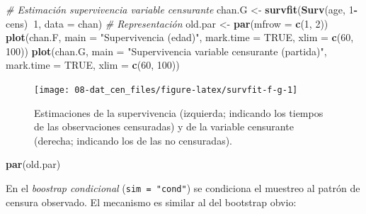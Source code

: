 \documentclass[]{book}
\newenvironment{Shaded}{\begin{snugshade}}{\end{snugshade}}
\newcommand{\KeywordTok}[1]{\textcolor[rgb]{0.13,0.29,0.53}{\textbf{#1}}}
\newcommand{\DataTypeTok}[1]{\textcolor[rgb]{0.13,0.29,0.53}{#1}}
\newcommand{\DecValTok}[1]{\textcolor[rgb]{0.00,0.00,0.81}{#1}}
\newcommand{\StringTok}[1]{\textcolor[rgb]{0.31,0.60,0.02}{#1}}
\newcommand{\CommentTok}[1]{\textcolor[rgb]{0.56,0.35,0.01}{\textit{#1}}}
\newcommand{\OtherTok}[1]{\textcolor[rgb]{0.56,0.35,0.01}{#1}}
\newcommand{\OperatorTok}[1]{\textcolor[rgb]{0.81,0.36,0.00}{\textbf{#1}}}
\newcommand{\NormalTok}[1]{#1}
\theoremstyle{definition}
\theoremstyle{definition}
\theoremstyle{definition}
\theoremstyle{remark}
\begin{document}
\begin{Shaded}
\begin{Highlighting}[]
\CommentTok{# Estimación supervivencia variable censurante}
\NormalTok{chan.G <-}\StringTok{ }\KeywordTok{survfit}\NormalTok{(}\KeywordTok{Surv}\NormalTok{(age, }\DecValTok{1}\OperatorTok{-}\NormalTok{cens)}\OperatorTok{~}\DecValTok{1}\NormalTok{, }\DataTypeTok{data =}\NormalTok{ chan)}
\CommentTok{# Representación}
\NormalTok{old.par <-}\StringTok{ }\KeywordTok{par}\NormalTok{(}\DataTypeTok{mfrow =} \KeywordTok{c}\NormalTok{(}\DecValTok{1}\NormalTok{, }\DecValTok{2}\NormalTok{))}
\KeywordTok{plot}\NormalTok{(chan.F, }\DataTypeTok{main =} \StringTok{"Supervivencia (edad)"}\NormalTok{, }\DataTypeTok{mark.time =} \OtherTok{TRUE}\NormalTok{, }
    \DataTypeTok{xlim =} \KeywordTok{c}\NormalTok{(}\DecValTok{60}\NormalTok{, }\DecValTok{100}\NormalTok{))}
\KeywordTok{plot}\NormalTok{(chan.G, }\DataTypeTok{main =} \StringTok{"Supervivencia variable censurante (partida)"}\NormalTok{, }
     \DataTypeTok{mark.time =} \OtherTok{TRUE}\NormalTok{, }\DataTypeTok{xlim =} \KeywordTok{c}\NormalTok{(}\DecValTok{60}\NormalTok{, }\DecValTok{100}\NormalTok{))}
\end{Highlighting}
\end{Shaded}

\begin{figure}[!htb]

{\centering \texttt{[image: 08-dat\_cen\_files/figure-latex/survfit-f-g-1]} 

}

\caption{Estimaciones de la supervivencia (izquierda; indicando los tiempos de las observaciones censuradas) y de la variable censurante (derecha; indicando los de las no censuradas).}\label{fig:survfit-f-g}
\end{figure}

\begin{Shaded}
\begin{Highlighting}[]
\KeywordTok{par}\NormalTok{(old.par)}
\end{Highlighting}
\end{Shaded}

En el \emph{boostrap condicional} (\texttt{sim\ =\ "cond"}) se
condiciona el muestreo al patrón de censura observado. El mecanismo es
similar al del bootstrap obvio:
\end{document}
